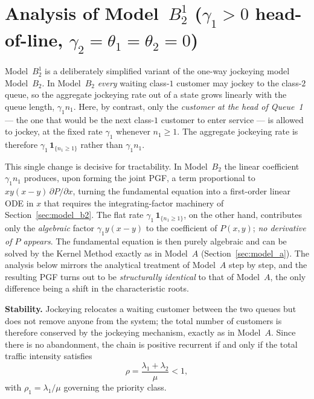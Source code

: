 \section{Analysis of Model~\texorpdfstring{$B_2^1$}{B21} (\texorpdfstring{$\gamma_1>0$}{gamma1>0} head-of-line, \texorpdfstring{$\gamma_2=\theta_1=\theta_2=0$}{gamma2=theta1=theta2=0})}
\label{sec:model_b21}

Model~$B_2^1$ is a deliberately simplified variant of the one-way jockeying model
Model~$B_2$. In Model~$B_2$ \emph{every} waiting class-$1$ customer may jockey to the
class-$2$ queue, so the aggregate jockeying rate out of a state grows linearly with the
queue length, $\gamma_1 n_1$. Here, by contrast, only the \emph{customer at the head of
Queue~1} --- the one that would be the next class-$1$ customer to enter service --- is
allowed to jockey, at the fixed rate $\gamma_1$ whenever $n_1\ge 1$. The aggregate
jockeying rate is therefore $\gamma_1\,\mathbf{1}_{\{n_1\ge 1\}}$ rather than
$\gamma_1 n_1$.

This single change is decisive for tractability. In Model~$B_2$ the linear coefficient
$\gamma_1 n_1$ produces, upon forming the joint PGF, a term proportional to
$xy(x-y)\,\partial P/\partial x$, turning the fundamental equation into a first-order
linear ODE in $x$ that requires the integrating-factor machinery of
Section~\ref{sec:model_b2}. The flat rate $\gamma_1\,\mathbf{1}_{\{n_1\ge1\}}$, on the
other hand, contributes only the \emph{algebraic} factor $\gamma_1 y(x-y)$ to the
coefficient of $P(x,y)$; \emph{no derivative of $P$ appears}. The fundamental equation is
then purely algebraic and can be solved by the Kernel Method exactly as in Model~$A$
(Section~\ref{sec:model_a}). The analysis below mirrors the analytical treatment of
Model~$A$ step by step, and the resulting PGF turns out to be \emph{structurally
identical} to that of Model~$A$, the only difference being a shift in the characteristic
roots.

\textbf{Stability.} Jockeying relocates a waiting customer between the two queues but does
not remove anyone from the system; the total number of customers is therefore conserved by
the jockeying mechanism, exactly as in Model~$A$. Since there is no abandonment, the chain
is positive recurrent if and only if the total traffic intensity satisfies
\begin{equation}
    \rho = \frac{\lambda_1+\lambda_2}{\mu} < 1,
    \label{eq:B21:stability}
\end{equation}
with $\rho_1=\lambda_1/\mu$ governing the priority class.

